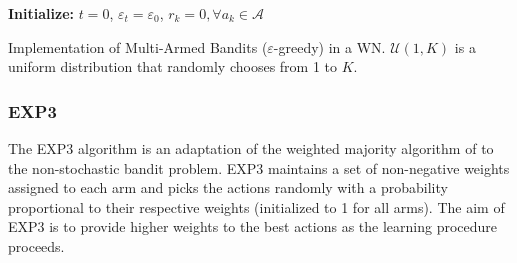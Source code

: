 \documentclass{article}
\begin{document}
	\begin{algorithm}[H]	
		\SetAlgoLined
		\textbf{Initialize:} $t=0$, $\varepsilon_t = \varepsilon_0$, $r_{k} = 0, \forall a_k \in \mathcal{A}$\\
		\caption{Implementation of Multi-Armed Bandits ($\varepsilon$-greedy) in a WN. $\mathcal{U}(1, K)$ is a uniform distribution that randomly chooses from 1 to $K$.}
		\label{alg:egreedy}			
	\end{algorithm}
	
	\subsubsection{EXP3}
	\label{section:bandits_exp3}	
	The EXP3 algorithm \cite{auer1995gambling,auer2002nonstochastic} is an adaptation of the weighted majority algorithm of \cite{LW94,FS97} to the non-stochastic bandit problem. EXP3 maintains a set of non-negative weights assigned to each arm and picks the actions randomly with a probability proportional to their respective weights (initialized to 1 for all arms). The aim of EXP3 is to provide higher weights to the best actions as the learning procedure proceeds. 
	
\end{document}
